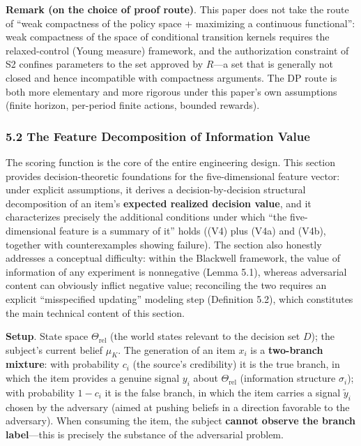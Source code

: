 \documentclass[
  11pt]{article}
\begin{document}
\textbf{Remark (on the choice of proof route)}. This paper does not take
the route of ``weak compactness of the policy space + maximizing a
continuous functional'': weak compactness of the space of conditional
transition kernels requires the relaxed-control (Young measure)
framework, and the authorization constraint of S2 confines parameters to
the set approved by \(R\)---a set that is generally not closed and hence
incompatible with compactness arguments. The DP route is both more
elementary and more rigorous under this paper's own assumptions (finite
horizon, per-period finite actions, bounded rewards).

\subsubsection{5.2 The Feature Decomposition of Information
Value}\label{the-feature-decomposition-of-information-value}

The scoring function is the core of the entire engineering design. This
section provides decision-theoretic foundations for the five-dimensional
feature vector: under explicit assumptions, it derives a
decision-by-decision structural decomposition of an item's
\textbf{expected realized decision value}, and it characterizes
precisely the additional conditions under which ``the five-dimensional
feature is a summary of it'' holds ((V4) plus (V4a) and (V4b), together
with counterexamples showing failure). The section also honestly
addresses a conceptual difficulty: within the Blackwell framework, the
value of information of any experiment is nonnegative (Lemma 5.1),
whereas adversarial content can obviously inflict negative value;
reconciling the two requires an explicit ``misspecified updating''
modeling step (Definition 5.2), which constitutes the main technical
content of this section.

\textbf{Setup}. State space \(\Theta_{\mathrm{rel}}\) (the world states
relevant to the decision set \(D\)); the subject's current belief
\(\mu_K\). The generation of an item \(x_i\) is a \textbf{two-branch
mixture}: with probability \(c_i\) (the source's credibility) it is the
true branch, in which the item provides a genuine signal \(y_i\) about
\(\Theta_{\mathrm{rel}}\) (information structure \(\sigma_i\)); with
probability \(1 - c_i\) it is the false branch, in which the item
carries a signal \(\tilde y_i\) chosen by the adversary (aimed at
pushing beliefs in a direction favorable to the adversary). When
consuming the item, the subject \textbf{cannot observe the branch
label}---this is precisely the substance of the adversarial problem.
\end{document}
